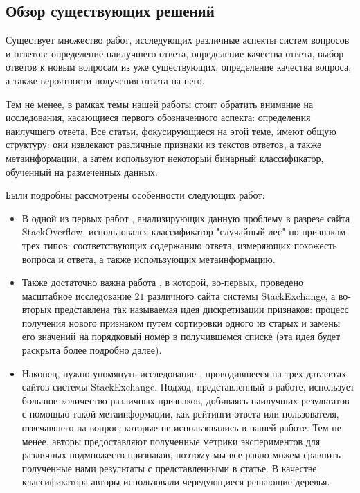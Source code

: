 \documentclass[../diploma.tex]{subfiles}
\begin{document}
	\label{sec:subject_area}

	\subsection{Обзор существующих решений}
   
	\label{subsec:existing_solutions}

	Существует множество работ, исследующих различные аспекты систем вопросов и ответов: 
	определение наилучшего ответа, определение качества ответа, выбор ответов к новым вопросам из уже существующих, 
	определение качества вопроса, а также вероятности получения ответа на него.

	Тем не менее, в рамках темы нашей работы стоит обратить внимание на исследования, касающиеся первого обозначенного аспекта: определения наилучшего ответа.
	Все статьи, фокусирующиеся на этой теме, имеют общую структуру: они извлекают различные признаки из текстов ответов, а также метаинформации, 
	а затем используют некоторый бинарный классификатор, обученный на размеченных данных.

	Были подробны рассмотрены особенности следующих работ:

	\begin{itemize}
		\item
		В одной из первых работ \cite{article:tian2013}, анализирующих данную проблему в разрезе сайта StackOverflow, использовался классификатор "случайный лес" по признакам трех типов:
		соответствующих содержанию ответа, измеряющих похожесть вопроса и ответа, а также использующих метаинформацию.

		\item
		Также достаточно важна работа \cite{article:gkotsis2014}, в которой, во-первых, проведено масштабное исследование $21$ различного сайта системы StackExchange,
		а во-вторых представлена так называемая идея дискретизации признаков: 
		процесс получения нового признаком путем сортировки одного из старых и замены его значений на порядковый номер в получившемся списке 
		(эта идея будет раскрыта более подробно далее).

		\item
		Наконец, нужно упомянуть исследование \cite{article:burel2012}, проводившееся на трех датасетах сайтов системы StackExchange.
		Подход, представленный в работе, использует большое количество различных признаков, добиваясь наилучших результатов с помощью такой метаинформации, 
		как рейтинги ответа или пользователя, отвечавшего на вопрос, которые не использовались в нашей работе.
		Тем не менее, авторы предоставляют полученные метрики экспериментов для различных подмножеств признаков, 
		поэтому мы все равно можем сравнить полученные нами результаты с представленными в статье.
		В качестве классификатора авторы использовали чередующиеся решающие деревья.

    \end{itemize}
\end{document}
